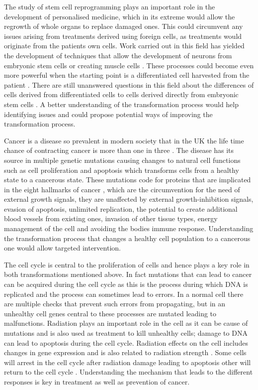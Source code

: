 The study of stem cell reprogramming plays an important role in the development of personalised medicine, which in its extreme would allow the regrowth of whole organs to replace damaged ones. This could circumvent any issues arising from treatments derived using foreign cells, as treatments would originate from the patients own cells. Work carried out in this field has yielded the development of techniques that allow the development of neurons from embryonic stem cells \citep{Vierbuchen:2010fa, Pang:2011ce} or creating muscle cells \citep{Ieda:2010ir, Efe:2011bpa}. These processes could become even more powerful when the starting point is a differentiated cell harvested from the patient \citep{Takahashi:2006hi}. There are still unanswered questions in this field about the differences of cells derived from differentiated cells to cells derived directly from embryonic stem cells \citep{Carey:2011bs, Bock:2011kx}. A better understanding of the transformation process would help identifying issues and could propose potential ways of improving the transformation process. 

Cancer is a disease so prevalent in modern society that in the UK the life time chance of contracting cancer is more than one in three \citep{Sasieni:2011}. The disease has its source in multiple genetic mutations causing changes to natural cell functions such as cell proliferation and apoptosis which transforms cells from a healthy state to a cancerous state. These mutations code for proteins that are implicated in the eight hallmarks of cancer \citep{Hanahan:2011gu}, which are the circumvention for the need of external growth signals, they are unaffected by external growth-inhibition signals, evasion of apoptosis, unlimited replication, the potential to create additional blood vessels from existing ones, invasion of other tissue types, energy management of the cell and avoiding the bodies immune response. Understanding the transformation process that changes a healthy cell population to a cancerous one would allow targeted intervention. 

The cell cycle is central to the proliferation of cells and hence plays a key role in both transformations mentioned above. In fact mutations that can lead to cancer can be acquired during the cell cycle as this is the process during which DNA is replicated and the process can sometimes lead to errors. In a normal cell there are multiple checks that prevent such errors from propagating, but in an unhealthy cell genes central to these processes are mutated leading to malfunctions. Radiation plays an important role in the cell as it can be cause of mutations and is also used as treatment to kill unhealthy cells; damage to DNA can lead to apoptosis during the cell cycle. Radiation effects on the cell includes changes in gene expression and is also related to radiation strength \citep{Gentile:2003in}. Some cells will arrest in the cell cycle after radiation damage leading to apoptosis other will return to the cell cycle \citep{Pawlik2004928}. Understanding the mechanism that leads to the different responses is key in treatment as well as prevention of cancer. 

